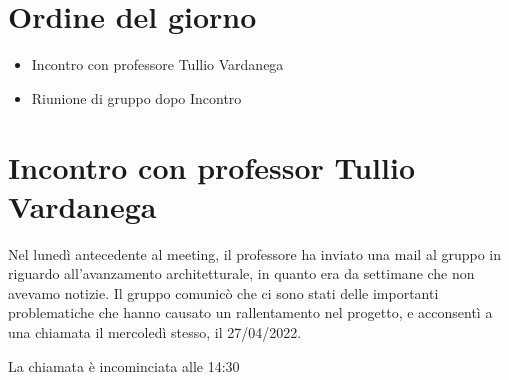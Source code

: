 \section{Ordine del giorno}
\begin{itemize}
	\item Incontro con professore Tullio Vardanega
	\item Riunione di gruppo dopo Incontro
\end{itemize}

\section{Incontro con professor Tullio Vardanega} 
Nel lunedì antecedente al meeting, il professore ha inviato una mail al gruppo 
in riguardo all'avanzamento architetturale, in quanto era da settimane che non avevamo notizie.\newline 
Il gruppo comunicò che ci sono stati delle importanti problematiche che hanno causato un rallentamento 
nel progetto, e acconsentì a una chiamata il mercoledì stesso, il 27/04/2022. \newline 
 
La chiamata è incominciata alle 14:30 
 
